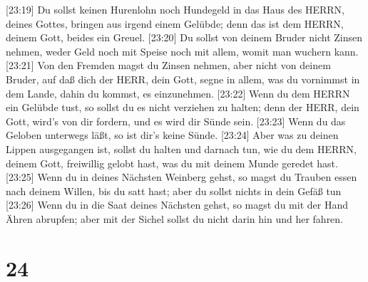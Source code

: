 {[}23:19{]} Du sollst keinen Hurenlohn noch Hundegeld in das Haus des
HERRN, deines Gottes, bringen aus irgend einem Gelübde; denn das ist dem
HERRN, deinem Gott, beides ein Greuel.  {[}23:20{]} Du
sollst von deinem Bruder nicht Zinsen nehmen, weder Geld noch mit Speise
noch mit allem, womit man wuchern kann.  {[}23:21{]} Von
den Fremden magst du Zinsen nehmen, aber nicht von deinem Bruder, auf
daß dich der HERR, dein Gott, segne in allem, was du vornimmst in dem
Lande, dahin du kommst, es einzunehmen.  {[}23:22{]} Wenn
du dem HERRN ein Gelübde tust, so sollst du es nicht verziehen zu
halten; denn der HERR, dein Gott, wird's von dir fordern, und es wird
dir Sünde sein.  {[}23:23{]} Wenn du das Geloben unterwegs
läßt, so ist dir's keine Sünde.  {[}23:24{]} Aber was zu
deinen Lippen ausgegangen ist, sollst du halten und darnach tun, wie du
dem HERRN, deinem Gott, freiwillig gelobt hast, was du mit deinem Munde
geredet hast.  {[}23:25{]} Wenn du in deines Nächsten
Weinberg gehst, so magst du Trauben essen nach deinem Willen, bis du
satt hast; aber du sollst nichts in dein Gefäß tun 
{[}23:26{]} Wenn du in die Saat deines Nächsten gehst, so magst du mit
der Hand Ähren abrupfen; aber mit der Sichel sollst du nicht darin hin
und her fahren.

\hypertarget{section-23}{%
\section{24}\label{section-23}}

